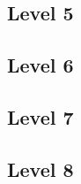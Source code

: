 \documentclass[12pt]{article}
\begin{document}
\subsection{Level 5}

\subsection{Level 6}

\subsection{Level 7}

\subsection{Level 8}
\end{document}
